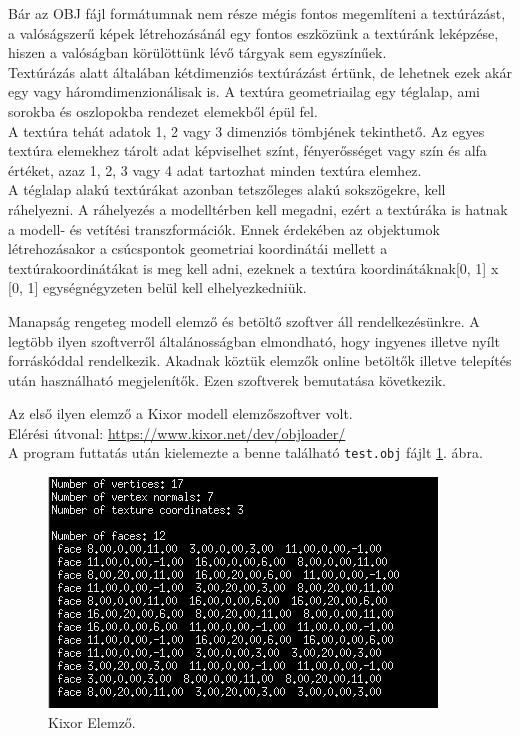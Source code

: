 Bár az OBJ fájl formátumnak nem része mégis fontos megemlíteni a textúrázást, a valóságszerű képek létrehozásánál egy fontos eszközünk a textúránk leképzése, hiszen a valóságban körülöttünk lévő tárgyak sem egyszínűek.\\

Textúrázás alatt általában kétdimenziós textúrázást értünk, de lehetnek ezek akár egy vagy háromdimenzionálisak is. A textúra geometriailag egy téglalap, ami sorokba és oszlopokba rendezet elemekből épül fel.\\

A textúra tehát adatok 1, 2 vagy 3 dimenziós tömbjének tekinthető. Az egyes textúra elemekhez tárolt adat képviselhet színt, fényerősséget vagy szín és alfa értéket, azaz 1, 2, 3 vagy 4 adat  tartozhat minden textúra elemhez.\\

A téglalap alakú textúrákat azonban tetszőleges alakú sokszögekre, kell ráhelyezni. A ráhelyezés a modelltérben kell megadni, ezért  a textúráka is hatnak a modell- és vetítési transzformációk. Ennek érdekében az objektumok létrehozásakor a csúcspontok geometriai koordinátái mellett a textúrakoordinátákat is meg kell adni, ezeknek a textúra koordinátáknak[0, 1] x [0, 1] egységnégyzeten belül kell elhelyezkedniük. \cite{juhasz2003opengl}

\newpage
{}

Manapság rengeteg modell elemző és betöltő szoftver áll rendelkezésünkre. A legtöbb ilyen szoftverről általánosságban elmondható, hogy ingyenes illetve  nyílt forráskóddal rendelkezik. Akadnak köztük elemzők online betöltők illetve telepítés után használható megjelenítők. Ezen szoftverek bemutatása következik.

Az első ilyen elemző a Kixor modell elemzőszoftver volt.\cite{micah1987markup}\\
Elérési útvonal: \url{https://www.kixor.net/dev/objloader/}\\

A program futtatás után kielemezte a benne található \texttt{test.obj} fájlt \ref{fig:kixor}. ábra.
\bigskip
\begin{figure}[h]
\centering
\includegraphics[scale=0.8]{images/kixor.png}
\caption{Kixor Elemző.}
\label{fig:kixor}
\end{figure}
\bigskip


